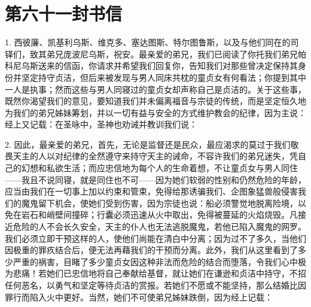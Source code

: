 

\section{第六十一封书信}

\par

\par

1. 西彼廉、凯基利乌斯、维克多、塞达图斯、特尔图鲁斯，以及与他们同在的司铎们，致其弟兄庞波尼乌斯，祝安。最亲爱的弟兄，我们已阅读了你托我们弟兄帕科尼乌斯送来的信函，你请求并希望我们回复你，告知我们对那些曾决定保持其身份并坚定持守贞洁，但后来被发现与男人同床共枕的童贞女有何看法；你提到其中一人是执事；然而这些与男人同寝过的童贞女却声称自己是贞洁的。关于这些事，既然你渴望我们的意见，要知道我们并未偏离福音与宗徒的传统，而是坚定恒久地为我们的弟兄姊妹筹划，并以一切有益与安全的方式维护教会的纪律，因为主说：经上又记载：在圣咏中，圣神也劝诫并教训我们说：\par

2. 因此，最亲爱的弟兄，首先，无论是监督还是民众，最应渴求的莫过于我们敬畏天主的人以对纪律的全然遵守来持守天主的诫命，不容许我们的弟兄迷失，凭自己的幻想和私欲生活；而应忠信地为每个人的生命着想，不让童贞女与男人同住——我且不说同寝，就是同住也不可——因为她们软弱的性别和仍然危险的年龄，应当由我们在一切事上加以约束和管束，免得给那诱骗我们、企图象猛兽般侵害我们的魔鬼留下机会，使她们受到伤害，因为宗徒也说：船必须警觉地脱离险境，以免在岩石和峭壁间撞碎；行囊必须迅速从火中取出，免得被蔓延的火焰烧毁。凡接近危险的人不会长久安全，天主的仆人也无法逃脱魔鬼，若他已陷入魔鬼的网罗。我们必须立即干预这样的人，使他们尚能在清白中分离；因为过不了多久，当他们因极重的罪疚结合后，便无法再藉我们的干预而分离。此外，我们从这里看到了多少严重的祸害，目睹了多少童贞女因这种非法而危险的结合而堕落，令我们心中极为悲痛！若她们已忠信地将自己奉献给基督，就让她们在谦逊和贞洁中持守，不招任何恶名，以勇气和坚定等待贞洁的赏报。若她们不愿或不能坚持，那么结婚比因罪行而陷入火中更好。当然，她们不可使弟兄姊妹跌倒，因为经上记载：\par

